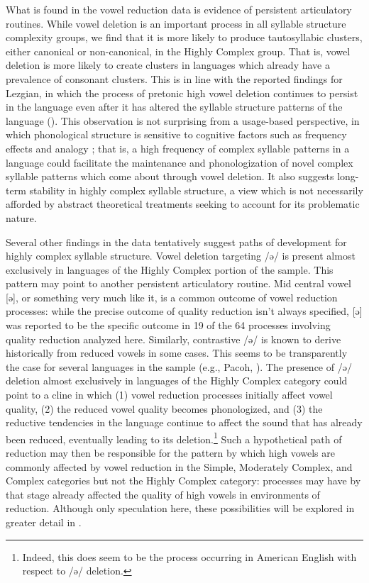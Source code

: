   What is found in the vowel reduction data is evidence of persistent articulatory routines. While vowel deletion is an important process in all syllable structure complexity groups, we find that it is more likely to produce tautosyllabic clusters, either canonical or non-canonical, in the Highly Complex group. That is, vowel deletion is more likely to create clusters in languages which already have a prevalence of consonant clusters. This is in line with the reported findings for Lezgian, in which the process of pretonic high vowel deletion continues to persist in the language even after it has altered the syllable structure patterns of the language (\citealt{ChitoranBabaliyeva2007}). This observation is not surprising from a usage-based perspective, in which phonological structure is sensitive to cognitive factors such as frequency effects and analogy \citep{Bybee2001}; that is, a high frequency of complex syllable patterns in a language could facilitate the maintenance and phonologization of novel complex syllable patterns which come about through vowel deletion. It also suggests long-term stability in highly complex syllable structure, a view which is not necessarily afforded by abstract theoretical treatments seeking to account for its problematic nature.

  Several other findings in the data tentatively suggest paths of development for highly complex syllable structure. Vowel deletion targeting /ə/ is present almost exclusively in languages of the Highly Complex portion of the sample. This pattern may point to another persistent articulatory routine. Mid central vowel [ə], or something very much like it, is a common outcome of vowel reduction processes: while the precise outcome of quality reduction isn’t always specified, [ə] was reported to be the specific outcome in 19 of the 64 processes involving quality reduction analyzed here. Similarly, contrastive /ə/ is known to derive historically from reduced vowels in some cases. This seems to be transparently the case for several languages in the sample (e.g., Pacoh, \citealt{Alves2000}). The presence of /ə/ deletion almost exclusively in languages of the Highly Complex category could point to a cline in which 
  (1) vowel reduction processes initially affect vowel quality, 
  (2) the reduced vowel quality becomes phonologized, and 
  (3) the reductive tendencies in the language continue to affect the sound that has already been reduced, eventually leading to its deletion.\footnote{{Indeed, this does seem to be the process occurring in American English with respect to /ə/ deletion.}} Such a hypothetical path of reduction may then be responsible for the pattern by which high vowels are commonly affected by vowel reduction in the Simple, Moderately Complex, and Complex categories but not the Highly Complex category: processes may have by that stage already affected the quality of high vowels in environments of reduction. Although only speculation here, these possibilities will be explored in greater detail in .

